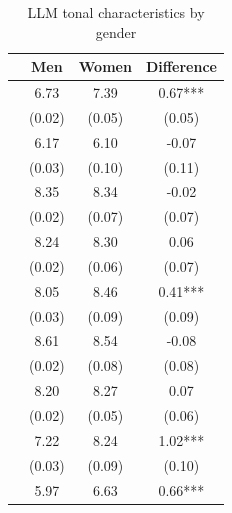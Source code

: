 \begin{table}
    \footnotesize
    \centering
    \begin{threeparttable}
        \caption{LLM tonal characteristics by gender}
        \label{table1llm}
        \begin{tabular}{p{5cm}S@{}S@{}S@{}}
            \toprule
            &{Men}&{Women}&{Difference}\\
            \midrule
               &        6.73&        7.39&        0.67***\\
                                          &      (0.02)&      (0.05)&      (0.05)   \\
            &        6.17&        6.10&       -0.07   \\
                                          &      (0.03)&      (0.10)&      (0.11)   \\
            &        8.35&        8.34&       -0.02   \\
                                          &      (0.02)&      (0.07)&      (0.07)   \\
             &        8.24&        8.30&        0.06   \\
                                          &      (0.02)&      (0.06)&      (0.07)   \\
            &        8.05&        8.46&        0.41***\\
                                          &      (0.03)&      (0.09)&      (0.09)   \\
            &        8.61&        8.54&       -0.08   \\
                                          &      (0.02)&      (0.08)&      (0.08)   \\
            &        8.20&        8.27&        0.07   \\
                                          &      (0.02)&      (0.05)&      (0.06)   \\
            &        7.22&        8.24&        1.02***\\
                                          &      (0.03)&      (0.09)&      (0.10)   \\
            &        5.97&        6.63&        0.66***\\

\end{tabular}
\end{threeparttable}
\end{table}
